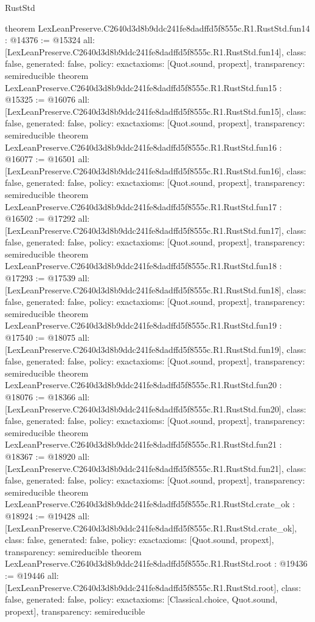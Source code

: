 \begin{lexlean}{RustStd}
\begin{coremodule}
{}
theorem LexLeanPreserve.C2640d3d8b9ddc241fe8dadffd5f8555c.R1.RustStd.fun14 : @14376 := @15324 {
  all: [LexLeanPreserve.C2640d3d8b9ddc241fe8dadffd5f8555c.R1.RustStd.fun14],
  class: false,
  generated: false,
  policy: exact{axioms: [Quot.sound, propext]},
  transparency: semireducible
}
theorem LexLeanPreserve.C2640d3d8b9ddc241fe8dadffd5f8555c.R1.RustStd.fun15 : @15325 := @16076 {
  all: [LexLeanPreserve.C2640d3d8b9ddc241fe8dadffd5f8555c.R1.RustStd.fun15],
  class: false,
  generated: false,
  policy: exact{axioms: [Quot.sound, propext]},
  transparency: semireducible
}
theorem LexLeanPreserve.C2640d3d8b9ddc241fe8dadffd5f8555c.R1.RustStd.fun16 : @16077 := @16501 {
  all: [LexLeanPreserve.C2640d3d8b9ddc241fe8dadffd5f8555c.R1.RustStd.fun16],
  class: false,
  generated: false,
  policy: exact{axioms: [Quot.sound, propext]},
  transparency: semireducible
}
theorem LexLeanPreserve.C2640d3d8b9ddc241fe8dadffd5f8555c.R1.RustStd.fun17 : @16502 := @17292 {
  all: [LexLeanPreserve.C2640d3d8b9ddc241fe8dadffd5f8555c.R1.RustStd.fun17],
  class: false,
  generated: false,
  policy: exact{axioms: [Quot.sound, propext]},
  transparency: semireducible
}
theorem LexLeanPreserve.C2640d3d8b9ddc241fe8dadffd5f8555c.R1.RustStd.fun18 : @17293 := @17539 {
  all: [LexLeanPreserve.C2640d3d8b9ddc241fe8dadffd5f8555c.R1.RustStd.fun18],
  class: false,
  generated: false,
  policy: exact{axioms: [Quot.sound, propext]},
  transparency: semireducible
}
theorem LexLeanPreserve.C2640d3d8b9ddc241fe8dadffd5f8555c.R1.RustStd.fun19 : @17540 := @18075 {
  all: [LexLeanPreserve.C2640d3d8b9ddc241fe8dadffd5f8555c.R1.RustStd.fun19],
  class: false,
  generated: false,
  policy: exact{axioms: [Quot.sound, propext]},
  transparency: semireducible
}
theorem LexLeanPreserve.C2640d3d8b9ddc241fe8dadffd5f8555c.R1.RustStd.fun20 : @18076 := @18366 {
  all: [LexLeanPreserve.C2640d3d8b9ddc241fe8dadffd5f8555c.R1.RustStd.fun20],
  class: false,
  generated: false,
  policy: exact{axioms: [Quot.sound, propext]},
  transparency: semireducible
}
theorem LexLeanPreserve.C2640d3d8b9ddc241fe8dadffd5f8555c.R1.RustStd.fun21 : @18367 := @18920 {
  all: [LexLeanPreserve.C2640d3d8b9ddc241fe8dadffd5f8555c.R1.RustStd.fun21],
  class: false,
  generated: false,
  policy: exact{axioms: [Quot.sound, propext]},
  transparency: semireducible
}
theorem LexLeanPreserve.C2640d3d8b9ddc241fe8dadffd5f8555c.R1.RustStd.crate_ok : @18924 := @19428 {
  all: [LexLeanPreserve.C2640d3d8b9ddc241fe8dadffd5f8555c.R1.RustStd.crate_ok],
  class: false,
  generated: false,
  policy: exact{axioms: [Quot.sound, propext]},
  transparency: semireducible
}
theorem LexLeanPreserve.C2640d3d8b9ddc241fe8dadffd5f8555c.R1.RustStd.root : @19436 := @19446 {
  all: [LexLeanPreserve.C2640d3d8b9ddc241fe8dadffd5f8555c.R1.RustStd.root],
  class: false,
  generated: false,
  policy: exact{axioms: [Classical.choice, Quot.sound, propext]},
  transparency: semireducible
}


\end{coremodule}
\end{lexlean}
